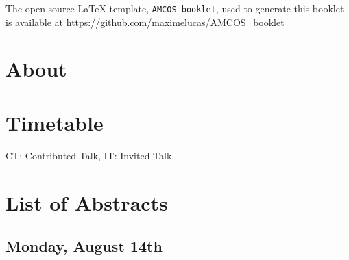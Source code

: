 \documentclass[openany, parskip=full, 12pt, a4]{scrbook}
\begin{document}
	
	
\mbox{}
\thispagestyle{empty}
\vfill
\begin{center}
The open-source \LaTeX{} template, \verb"AMCOS_booklet", used to generate this booklet is available at \url{https://github.com/maximelucas/AMCOS\_booklet}
\end{center}

\newpage

\tableofcontents

\chapter{About}



\chapter{Timetable}

CT: Contributed Talk, IT: Invited Talk.
\newpage


\chapter{List of Abstracts}

\section{Monday, August 14th}








\end{document}

